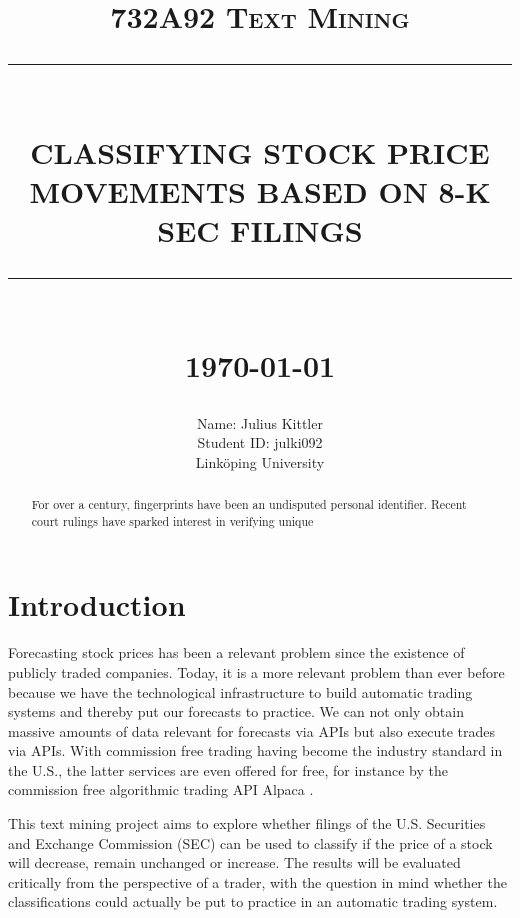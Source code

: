 \documentclass{article}
\newcommand{\HRule}[1]{\rule{\linewidth}{#1}}
\begin{document}
	
	\title{\textsc{732A92 Text Mining} \\ [2.0cm]
		\HRule{0.5pt} \\
		\LARGE \textbf{\uppercase{Classifying Stock Price Movements based on 8-K SEC filings}}
		\HRule{2pt} \\ [0.5cm]
		\normalsize \today \vspace*{5\baselineskip}}
	
	\date{}
	
	\author{
		Name: Julius Kittler \\ 
		Student ID: julki092 \\ 
		Link\"{o}ping University}
	
	\maketitle
	\newpage
	
	\begin{abstract}
		
		For over a century, fingerprints have been an undisputed
		personal identifier.  Recent court rulings have sparked
		interest in verifying unique
	\end{abstract}

	\newpage
	\tableofcontents
	\newpage
	\listoffigures
	\newpage

	\section{Introduction}
	
	Forecasting stock prices has been a relevant problem since the existence of publicly traded companies. Today, it is a more relevant problem than ever before because we have the technological infrastructure to build automatic trading systems and thereby put our forecasts to practice. We can not only obtain massive amounts of data relevant for forecasts via APIs but also execute trades via APIs. With commission free trading having become the industry standard in the U.S., the latter services are even offered for free, for instance by the commission free algorithmic trading API Alpaca \cite{noauthor_alpaca_nodate}. 
	
	This text mining project aims to explore whether filings of the U.S. Securities and Exchange Commission (SEC) can be used to classify if the price of a stock will decrease, remain unchanged or increase. The results will be evaluated critically from the perspective of a trader, with the question in mind whether the classifications could actually be put to practice in an automatic trading system.
	
\end{document}
